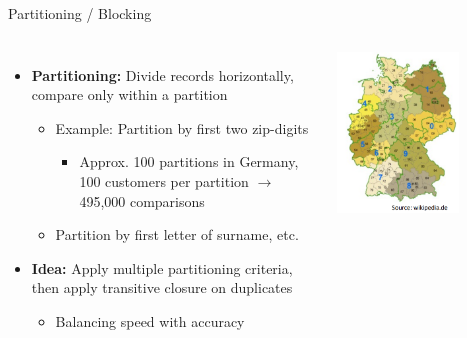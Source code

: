 \documentclass[aspectratio=169]{../latex_main/tntbeamer}  %
\begin{document}
\begin{frame}[c]{Partitioning / Blocking}

\begin{columns}


        \begin{itemize}
            \item \textbf{Partitioning:} Divide records horizontally, compare only within a partition
            \begin{itemize}
                \item Example: Partition by first two zip-digits
                \begin{itemize}
                    \item Approx. 100 partitions in Germany, 100 customers per partition $\to$ 495,000 comparisons
                \end{itemize}
                \item Partition by first letter of surname, etc.
            \end{itemize}
            \item \textbf{Idea:} Apply multiple partitioning criteria, then apply transitive closure on duplicates
            \begin{itemize}
                \item Balancing speed with accuracy
            \end{itemize}
        \end{itemize}


        \centering\includegraphics[width=0.7\textwidth]{figure/bild27_part}
    
\end{columns}


\end{frame}
\end{document}
